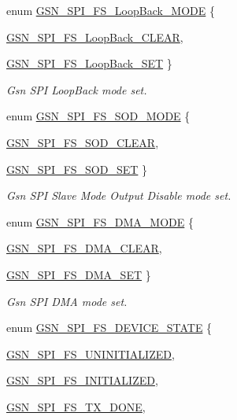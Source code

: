 \begin{DoxyCompactItemize}
enum \hyperlink{a00655_ga082cec3b28f66e93faf6463fa1b76413}{GSN\_\-SPI\_\-FS\_\-LoopBack\_\-MODE} \{ \par
\hyperlink{a00655_gga082cec3b28f66e93faf6463fa1b76413a05a16837b5f54c934ddf4eaee2caeaac}{GSN\_\-SPI\_\-FS\_\-LoopBack\_\-CLEAR}, 
\par
\hyperlink{a00655_gga082cec3b28f66e93faf6463fa1b76413a438b96d1fb5d5036988600678c8ba207}{GSN\_\-SPI\_\-FS\_\-LoopBack\_\-SET}
 \}
\begin{DoxyCompactList}\small\item\em Gsn SPI LoopBack mode set. \end{DoxyCompactList}\item 
enum \hyperlink{a00655_ga7fdf2844c62b8075aa8d730cc4e17134}{GSN\_\-SPI\_\-FS\_\-SOD\_\-MODE} \{ \par
\hyperlink{a00655_gga7fdf2844c62b8075aa8d730cc4e17134ae2acc61c8aef0461e99c6009f50350b9}{GSN\_\-SPI\_\-FS\_\-SOD\_\-CLEAR}, 
\par
\hyperlink{a00655_gga7fdf2844c62b8075aa8d730cc4e17134aa50aaafe62fb864c5f2591a5401d3dfe}{GSN\_\-SPI\_\-FS\_\-SOD\_\-SET}
 \}
\begin{DoxyCompactList}\small\item\em Gsn SPI Slave Mode Output Disable mode set. \end{DoxyCompactList}\item 
enum \hyperlink{a00655_ga527bb8ce76fef8354e9db5ed16509e26}{GSN\_\-SPI\_\-FS\_\-DMA\_\-MODE} \{ \par
\hyperlink{a00655_gga527bb8ce76fef8354e9db5ed16509e26a0de7099704e5c861c316a36560d6143d}{GSN\_\-SPI\_\-FS\_\-DMA\_\-CLEAR}, 
\par
\hyperlink{a00655_gga527bb8ce76fef8354e9db5ed16509e26aeb323e7a43a2feafa7d2654997d9291d}{GSN\_\-SPI\_\-FS\_\-DMA\_\-SET}
 \}
\begin{DoxyCompactList}\small\item\em Gsn SPI DMA mode set. \end{DoxyCompactList}\item 
enum \hyperlink{a00589_a0e734f119d784afd32b10d30c8cca2f6}{GSN\_\-SPI\_\-FS\_\-DEVICE\_\-STATE} \{ \par
\hyperlink{a00589_a0e734f119d784afd32b10d30c8cca2f6a69ab93307f72882ece3cfa14aab97795}{GSN\_\-SPI\_\-FS\_\-UNINITIALIZED}, 
\par
\hyperlink{a00589_a0e734f119d784afd32b10d30c8cca2f6ac4c1b7b90d7dd36fae88d36c617ae744}{GSN\_\-SPI\_\-FS\_\-INITIALIZED}, 
\par
\hyperlink{a00589_a0e734f119d784afd32b10d30c8cca2f6a4e603b0ffe264b5426fd3c113ca6f4a0}{GSN\_\-SPI\_\-FS\_\-TX\_\-DONE}, 

\end{DoxyCompactItemize}
